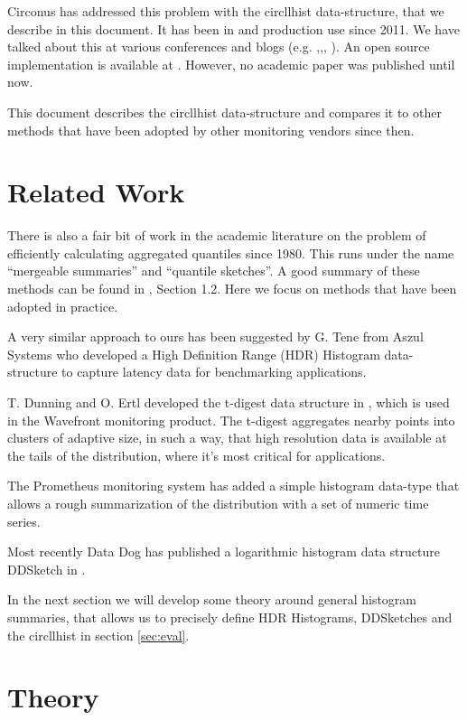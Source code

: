 \documentclass{article}
\theoremstyle{plain}
\theoremstyle{remark}
\begin{document}
Circonus has addressed this problem with the circllhist data-structure, that we describe in this document.
It has been in and production use since 2011.
We have talked about this at various conferences and blogs (e.g. \cite{TS0},\cite{TS1},\cite{TS2}, \cite{HH1}).
An open source implementation is available at \cite{libcircllhist}.
However, no academic paper was published until now.

This document describes the circllhist data-structure and compares it to other methods
that have been adopted by other monitoring vendors since then.

\section{Related Work} \label{sec:rw}

There is also a fair bit of work in the academic literature on the problem of efficiently
calculating aggregated quantiles since 1980. This runs under the name ``mergeable summaries'' and
``quantile sketches''. A good summary of these methods can be found in \cite{dd}, Section 1.2.
Here we focus on methods that have been adopted in practice.

A very similar approach to ours has been suggested by G. Tene from Aszul Systems who developed
a High Definition Range (HDR) Histogram data-structure \cite{hdr} to capture latency
data for benchmarking applications.

T. Dunning and O. Ertl developed the t-digest data structure in \cite{tdigest}, which is used in the
Wavefront monitoring product. The t-digest aggregates
nearby points into clusters of adaptive size, in such a way, that high resolution data is available
at the tails of the distribution, where it's most critical for applications.

The Prometheus monitoring system \cite{prom} has added a simple histogram data-type that allows a
rough summarization of the distribution with a set of numeric time series.

Most recently Data Dog has published a logarithmic histogram data structure DDSketch in \cite{dd}.

In the next section we will develop some theory around general histogram summaries, that allows us
to precisely define HDR Histograms, DDSketches and the circllhist in section \ref{sec:eval}.

\section{Theory}
\end{document}
